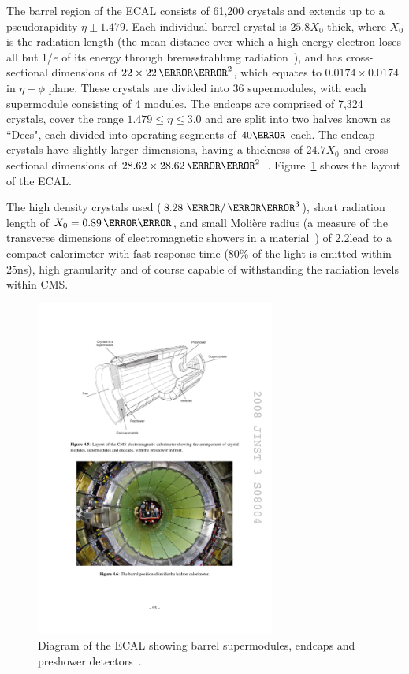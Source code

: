The barrel region of the ECAL consists of 61,200 crystals and extends up to a pseudorapidity $\eta\pm1.479$.
Each individual barrel crystal is $25.8X_{0}$ thick, where $X_{0}$ is the radiation length (the mean distance
over which a high energy electron loses all but 1/$e$ of its energy through bremsstrahlung
radiation~\cite{Agashe:2014kda}), and has cross-sectional dimensions of $22\times22\mm^{2}$, which equates to
$0.0174\times0.0174$ in $\eta-\phi$ plane. These crystals are divided into 36 supermodules, with each
supermodule consisting of 4 modules. The endcaps are comprised of 7,324 crystals, cover the range
$1.479\leq\eta\leq3.0$ and are split into two halves known as ``Dees", each divided into operating segments of
$40\degreeCelsius$ each. The endcap crystals have slightly larger dimensions, having a thickness of
$24.7X_{0}$ and cross-sectional dimensions of
$28.62\times28.62\mm^{2}$~\cite{CMS_experiment,ECAL_frontend_monitoring}.
Figure~\ref{fig:CMS_ECAL} shows the layout of the ECAL.

The high density crystals used ($8.28~\g/\cm^{3}$), short radiation length of $X_{0}=0.89\cm$, and small
Moli\`{e}re radius (a measure of the transverse dimensions of electromagnetic showers in a
material~\cite{Agashe:2014kda}) of 2.2\cm lead to a compact calorimeter with fast response time (80\% of the
light is emitted within 25ns), high granularity and of course capable of withstanding the radiation levels
within CMS.

\begin{figure}[hbtp]
   \centering
     \includegraphics[width=0.7\textwidth]{Chapters/02_Detector/Images/ECAL.pdf}\hfill
     \caption[Diagram of the ECAL showing barrel supermodules, endcaps and preshower detectors.]{Diagram of
     the ECAL showing barrel supermodules, endcaps and preshower
     detectors~\cite{ECAL_calibration_and_resolution_at_7TeV}.}
     \label{fig:CMS_ECAL}
\end{figure}

